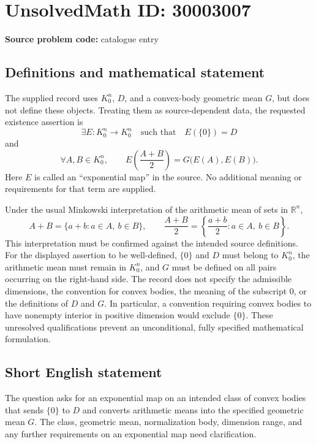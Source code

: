 \documentclass[11pt]{article}
\newcommand{\R}{\mathbb{R}}
\begin{document}
\section*{UnsolvedMath ID: 30003007}
\textbf{Source problem code:} catalogue entry
\subsection{Definitions and mathematical statement}
The supplied record uses \(K_0^n\), \(D\), and a convex-body geometric mean \(G\), but does not define these objects. Treating them as source-dependent data, the requested existence assertion is
\[
\exists E:K_0^n\longrightarrow K_0^n\quad\text{such that}\quad E(\{0\})=D
\]
and
\[
\forall A,B\in K_0^n,\qquad E\!\left(\frac{A+B}{2}\right)=G\bigl(E(A),E(B)\bigr).
\]
Here \(E\) is called an ``exponential map'' in the source. No additional meaning or requirements for that term are supplied.

Under the usual Minkowski interpretation of the arithmetic mean of sets in \(\R^n\),
\[
A+B=\{a+b:a\in A,\ b\in B\},\qquad
\frac{A+B}{2}=\left\{\frac{a+b}{2}:a\in A,\ b\in B\right\}.
\]
This interpretation must be confirmed against the intended source definitions. For the displayed assertion to be well-defined, \(\{0\}\) and \(D\) must belong to \(K_0^n\), the arithmetic mean must remain in \(K_0^n\), and \(G\) must be defined on all pairs occurring on the right-hand side. The record does not specify the admissible dimensions, the convention for convex bodies, the meaning of the subscript \(0\), or the definitions of \(D\) and \(G\). In particular, a convention requiring convex bodies to have nonempty interior in positive dimension would exclude \(\{0\}\). These unresolved qualifications prevent an unconditional, fully specified mathematical formulation.
\subsection{Short English statement}
The question asks for an exponential map on an intended class of convex bodies that sends \(\{0\}\) to \(D\) and converts arithmetic means into the specified geometric mean \(G\). The class, geometric mean, normalization body, dimension range, and any further requirements on an exponential map need clarification.
\end{document}

